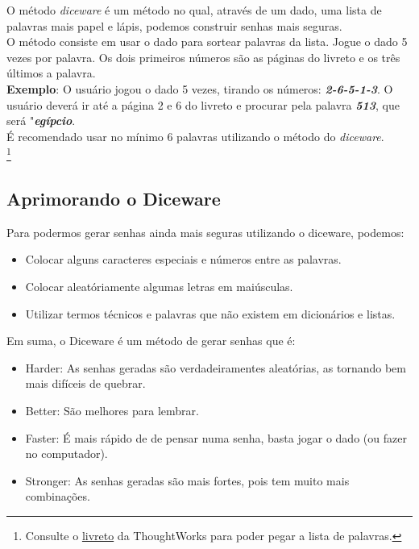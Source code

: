 \documentclass[12pt, letterpaper]{report}
\begin{document}
	O método \textit{diceware} é um método no qual, através de um dado, uma lista de palavras mais papel e lápis, podemos construir senhas mais seguras.\\

	O método consiste em usar o dado para sortear palavras da lista. Jogue o dado 5 vezes por palavra. Os dois primeiros números são as páginas do livreto e os três últimos a palavra.\\

	\textbf{Exemplo}: O usuário jogou o dado 5 vezes, tirando os números: \textbf{\textit{2-6-5-1-3}}. O usuário deverá ir até a página 2 e 6 do livreto e procurar pela palavra \textbf{\textit{513}}, que será "\textbf{\textit{egípcio}}.\\

	É recomendado usar no mínimo 6 palavras utilizando o método do \textit{diceware}.\\


	\footnote{Consulte o \href{https://github.com/thoughtworks/dadoware}{livreto} da ThoughtWorks para poder pegar a lista de palavras.}


\subsection{Aprimorando o Diceware}

	Para podermos gerar senhas ainda mais seguras utilizando o diceware, podemos:

\begin{itemize}
	\item Colocar alguns caracteres especiais e números entre as palavras.
	\item Colocar aleatóriamente algumas letras em maiúsculas.
	\item Utilizar termos técnicos e palavras que não existem em dicionários e listas.
\end{itemize}

	Em suma, o Diceware é um método de gerar senhas que é:

\begin{itemize}
	\item Harder: As senhas geradas são verdadeiramentes aleatórias, as tornando bem mais difíceis de quebrar.
	\item Better: São melhores para lembrar.
	\item Faster: É mais rápido de de pensar numa senha, basta jogar o dado (ou fazer no computador).
	\item Stronger: As senhas geradas são mais fortes, pois tem muito mais combinações.
\end{itemize}
\end{document}
